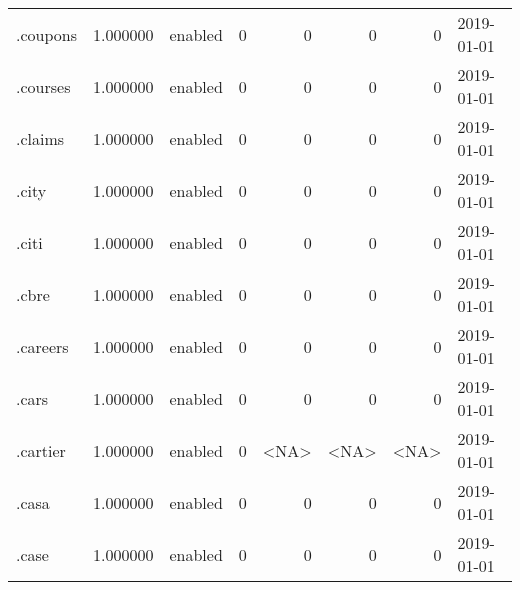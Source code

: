 \begin{tabular}{lrlrrrrl}
.coupons                  &          1.000000 &         enabled &                           0 &                           0 &                           0 &                   0 &           2019-01-01 \\
.courses                  &          1.000000 &         enabled &                           0 &                           0 &                           0 &                   0 &           2019-01-01 \\
.claims                   &          1.000000 &         enabled &                           0 &                           0 &                           0 &                   0 &           2019-01-01 \\
.city                     &          1.000000 &         enabled &                           0 &                           0 &                           0 &                   0 &           2019-01-01 \\
.citi                     &          1.000000 &         enabled &                           0 &                           0 &                           0 &                   0 &           2019-01-01 \\
.cbre                     &          1.000000 &         enabled &                           0 &                           0 &                           0 &                   0 &           2019-01-01 \\
.careers                  &          1.000000 &         enabled &                           0 &                           0 &                           0 &                   0 &           2019-01-01 \\
.cars                     &          1.000000 &         enabled &                           0 &                           0 &                           0 &                   0 &           2019-01-01 \\
.cartier                  &          1.000000 &         enabled &                           0 &                        <NA> &                        <NA> &                <NA> &           2019-01-01 \\
.casa                     &          1.000000 &         enabled &                           0 &                           0 &                           0 &                   0 &           2019-01-01 \\
.case                     &          1.000000 &         enabled &                           0 &                           0 &                           0 &                   0 &           2019-01-01 \\

\end{tabular}
